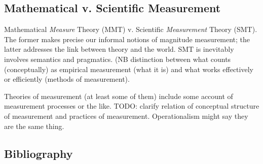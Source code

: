 \documentclass[11pt,twoside]{article}
\begin{document}
\subsection{Mathematical v. Scientific Measurement}

Mathematical \textit{Measure} Theory (MMT) v. Scientific
\textit{Measurement} Theory (SMT).  The former makes precise our
informal notions of magnitude measurement; the latter addresses the
link between theory and the world.  SMT is inevitably involves
semantics and pragmatics.  (NB distinction between what counts
(conceptually) as empirical measurement (what it is) and what works
effectively or efficiently (methods of measurement).

Theories of measurement (at least some of them) include some account
of measurement processes or the like.  TODO: clarify relation of
conceptual structure of measurement and practices of measurement.
Operationalism might say they are the same thing.  

\clearpage
\appendix
\begin{appendices}
\section{Bibliography}
\printbibliography[heading=none]
\end{appendices}
\end{document}
